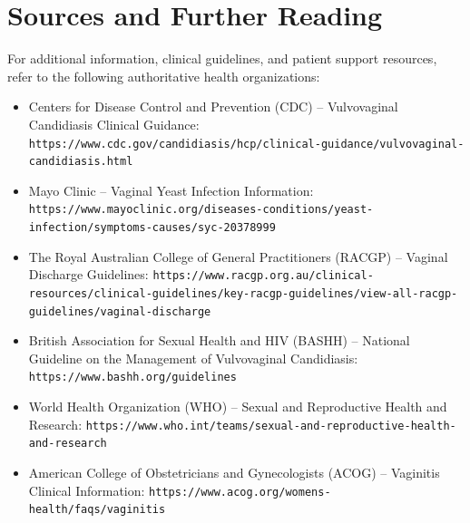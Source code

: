 \section*{Sources and Further Reading}
For additional information, clinical guidelines, and patient support resources, refer to the following authoritative health organizations:
\begin{itemize}
    \item Centers for Disease Control and Prevention (CDC) -- Vulvovaginal Candidiasis Clinical Guidance: \texttt{https://www.cdc.gov/candidiasis/hcp/clinical-guidance/vulvovaginal-candidiasis.html}
    \item Mayo Clinic -- Vaginal Yeast Infection Information: \texttt{https://www.mayoclinic.org/diseases-conditions/yeast-infection/symptoms-causes/syc-20378999}
    \item The Royal Australian College of General Practitioners (RACGP) -- Vaginal Discharge Guidelines: \texttt{https://www.racgp.org.au/clinical-resources/clinical-guidelines/key-racgp-guidelines/view-all-racgp-guidelines/vaginal-discharge}
    \item British Association for Sexual Health and HIV (BASHH) -- National Guideline on the Management of Vulvovaginal Candidiasis: \texttt{https://www.bashh.org/guidelines}
    \item World Health Organization (WHO) -- Sexual and Reproductive Health and Research: \texttt{https://www.who.int/teams/sexual-and-reproductive-health-and-research}
    \item American College of Obstetricians and Gynecologists (ACOG) -- Vaginitis Clinical Information: \texttt{https://www.acog.org/womens-health/faqs/vaginitis}
\end{itemize}